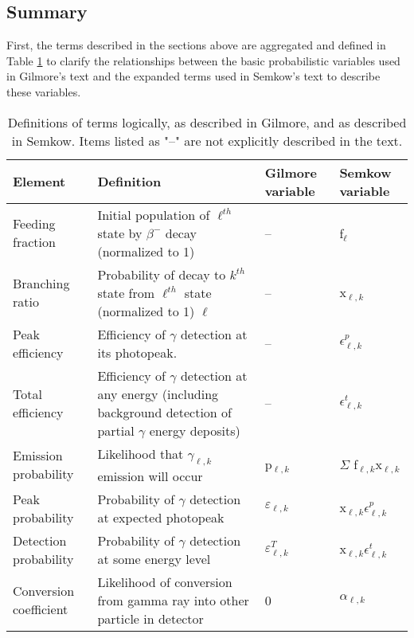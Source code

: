 \documentclass[12pt,twoside]{reedthesis}
\begin{document}
\subsection{Summary}
First, the terms described in the sections above are aggregated and defined in Table \ref{probabilities} to clarify the relationships between the basic probabilistic variables used in Gilmore's text and the expanded terms used in Semkow's text to describe these variables. 

\begin{table}[h!]
\caption[Definitions of terms]{Definitions of terms logically, as described in Gilmore, and as described in Semkow. Items listed as "--" are not explicitly described in the text.} 
\begin{center}
\begin{tabular}{| p{3 cm} | p{4.5 cm} | l | l |}
\hline
\textbf{Element} & \textbf{Definition} & \textbf{Gilmore variable} & \textbf{Semkow variable} \\ 
\hline
\hline
Feeding fraction & Initial population of $\ell^{th}$ state by $\beta^{-}$ decay (normalized to 1) &--& f$_{\ell}$ \\ 
\hline
Branching ratio & Probability of decay to $k^{th}$ state from $\ell^{th}$ state (normalized to 1) $\ell$ & -- & x$_{\ell,k}$ \\
\hline
Peak efficiency & Efficiency of $\gamma$ detection at its photopeak. & -- & $\epsilon^{p}_{\ell,k}$ \\
\hline
Total efficiency & Efficiency of $\gamma$ detection at any energy (including background detection of partial $\gamma$ energy deposits) & -- & $\epsilon^{t}_{\ell,k}$ \\
\hline
Emission probability	& Likelihood that $\gamma_{\ell,k}$ emission will occur & p$_{\ell,k}$ & $\Sigma$ f$_{\ell,k}$x$_{\ell,k}$  \\
\hline
Peak probability & Probability of $\gamma$ detection at expected photopeak & $\varepsilon_{\ell,k}$ & x$_{\ell,k}$$\epsilon^{p}_{\ell,k}$\\
\hline
Detection probability & Probability of $\gamma$ detection at some energy level & $\varepsilon^{T}_{\ell,k}$ & x$_{\ell,k}$$\epsilon^{t}_{\ell,k}$\\
\hline
Conversion coefficient & Likelihood of conversion from gamma ray into other particle in detector & 0 & $\alpha_{\ell,k}$ \\
\hline 
\end{tabular}
\end{center}
\label{probabilities}
\end{table}
\end{document}
